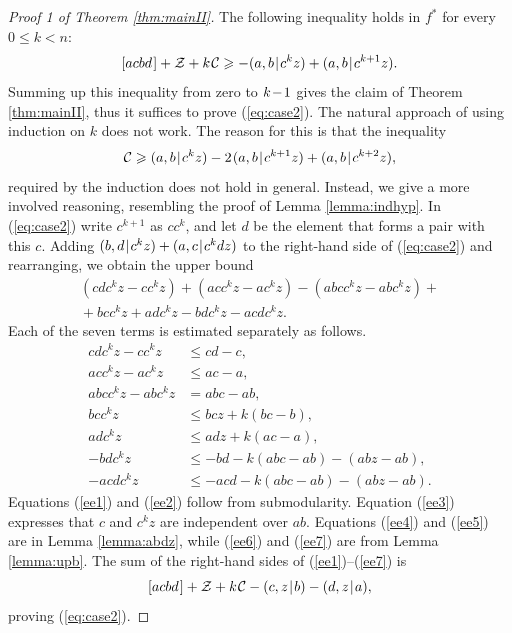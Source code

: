 \documentclass[reqno]{amsart}
\theoremstyle{definition}
\newcommand\tsp{\mkern 1.5mu}
\def\|{\mkern1.5mu{|}\mkern1.5mu}
\renewcommand\ge{\geqslant}\renewcommand\le{\leqslant}
\newcommand\C{\mathcal C}
\newcommand\Z{\mathcal Z} %
\def\m#1{\tsp{#1}\tsp}
\def\acbd{[acbd\tsp]}
\begin{document}
\begin{proof}[Proof 1 of Theorem \ref{thm:mainII}]
The following inequality holds in $f^*$ for every $0\le k<n$:
\begin{equation}\label{eq:case2}
    \acbd + \Z + k\tsp\C \ge -(a,b\|c^kz)+(a,b\|c^{k+1}z).
\end{equation}
Summing up this inequality from zero to $k\m-1$ gives the claim of Theorem
\ref{thm:mainII}, thus it suffices to prove (\ref{eq:case2}). The natural
approach of using induction on $k$ does not work. The reason for this is
that the inequality
$$
    \C \ge (a,b\|c^kz)-2\tsp(a,b\|c^{k+1}z)+ (a,b\|c^{k+2}z),
$$
required by the induction does not hold in general. Instead, we give a more
involved reasoning, resembling the proof of Lemma \ref{lemma:indhyp}. In
(\ref{eq:case2}) write $c^{k+1}$ as $cc^k$, and let $d$ be the element that
forms a pair with this $c$. Adding $(b,d\|c^kz)+(a,c\|c^kdz)$ to the
right-hand side of (\ref{eq:case2}) and rearranging, we obtain the upper
bound
$$\begin{array}{c}
  (cdc^kz-cc^kz) +(acc^kz-ac^kz) -(abcc^kz - abc^kz) +{}\\[3pt]
  {} +bcc^kz + adc^kz   - bdc^kz-acdc^kz.
\end{array}$$
Each of the seven terms is estimated separately as follows.
\begin{align}
 cdc^kz-cc^kz &\le cd-c, \label{ee1}\\
 acc^kz-ac^kz&\le ac-a, \label{ee2}\\
 abcc^kz - abc^kz &= abc-ab,  \label{ee3} \\
 bcc^kz           &\le bcz + k(bc-b),\label{ee4} \\
 adc^kz           &\le adz + k(ac-a), \label{ee5}\\
 -bdc^kz  &\le -bd - k(abc-ab)-(abz-ab), \label{ee6}\\
 -acdc^kz &\le -acd-k(abc-ab)-(abz-ab). \label{ee7}
\end{align}
Equations (\ref{ee1}) and (\ref{ee2}) follow from submodularity. Equation
(\ref{ee3}) expresses that $c$ and $c^kz$ are independent over $ab$.
Equations (\ref{ee4}) and (\ref{ee5}) are in Lemma \ref{lemma:abdz}, while
(\ref{ee6}) and (\ref{ee7}) are from Lemma \ref{lemma:upb}. The sum of the
right-hand sides of (\ref{ee1})--(\ref{ee7}) is
$$
   \acbd+\Z+k\tsp\C-(c,z\|b)-(d,z\|a),
$$
proving (\ref{eq:case2}).
\end{proof}
\end{document}
